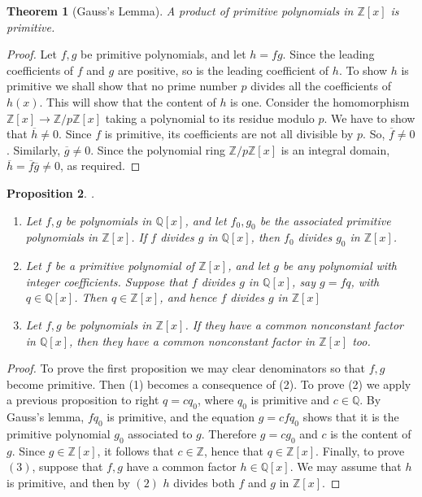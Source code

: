 \documentclass[12pt]{article}
\newtheorem{thm}{Theorem}[section]
\newtheorem{prop}[thm]{Proposition}
\theoremstyle{definition}
\theoremstyle{remark}
\numberwithin{equation}{section}
\newcommand\Z{\mathbb Z}    %
\newcommand\Q{\mathbb Q}    %
\begin{document}
\begin{thm}[Gauss's Lemma]
        A product of primitive polynomials in $\Z[x]$ is primitive.
\end{thm}
\begin{proof}
        Let $f,g$ be primitive polynomials, and let $h=fg$. Since the leading coefficients of $f$ and $g$ are positive, so is the leading coefficient of $h$. To show $h$ is primitive we shall show that no prime number $p$ divides all the coefficients of $h(x)$. This will show that the content of $h$ is one. Consider the homomorphism $\Z[x]\rightarrow \Z/p\Z[x]$ taking a polynomial to its residue modulo $p$. We have to show that $\overline{h} \neq 0$. Since $f$ is primitive, its coefficients are not all divisible by $p$. So, $\overline{f} \neq 0$. Similarly, $\overline{g} \neq 0$. Since the polynomial ring $\Z/p\Z[x]$ is an integral domain, $\overline{h} = \overline{f}\overline{g} \neq 0$, as required.
\end{proof}

\vspace{15pt}


\begin{prop}
        .\newline \begin{enumerate}
                \item Let $f,g$ be polynomials in $\Q[x]$, and let $f_0, g_0$ be the associated primitive polynomials in $\Z[x]$. If $f$ divides $g$ in $\Q[x]$, then $f_0$ divides $g_0$ in $\Z[x]$.
                \item Let $f$ be a primitive polynomial of $\Z[x]$, and let $g$ be any polynomial with integer coefficients. Suppose that $f$ divides $g$ in $\Q[x]$, say $g = fq$, with $q \in \Q[x]$. Then $q \in \Z[x]$, and hence $f$ divides $g$ in $\Z[x]$
                \item Let $f,g$ be polynomials in $\Z[x]$. If they have a common nonconstant factor in $\Q[x]$, then they have a common nonconstant factor in $\Z[x]$ too.
        \end{enumerate}
\end{prop}
\begin{proof}
        To prove the first proposition we may clear denominators so that $f,g$ become primitive. Then (1) becomes a consequence of (2). To prove (2) we apply a previous proposition to right $q = cq_0$, where $q_0$ is primitive and $c \in \Q$. By Gauss's lemma, $fq_0$ is primitive, and the equation $g = cfq_0$ shows that it is the primitive polynomial $g_0$ associated to $g$. Therefore $g = cg_0$ and $c$ is the content of $g$. Since $g \in \Z[x]$, it follows that $c \in \Z$, hence that $q \in \Z[x]$. Finally, to prove $(3)$, suppose that $f,g$ have a common factor $h \in \Q[x]$. We may assume that $h$ is primitive, and then by $(2)$ $h$ divides both $f$ and $g$ in $\Z[x]$.
\end{proof}
\end{document}
